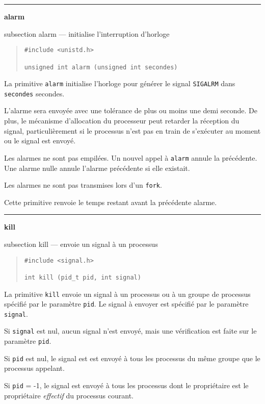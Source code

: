 \documentclass [twoside] {report}
\newcommand {\primitive} [1]
    {
	\phantomsection
	{\large \bf #1}
	\addcontentsline {toc} {subsection} {#1}
    }
\newcommand {\separation}
    {
	\vspace {5mm}
	\nopagebreak
	\hrule
    }
\begin{document}
\separation
\primitive {alarm} --- initialise l'interruption d'horloge

\begin {quote}
\begin {verbatim}
#include <unistd.h>

unsigned int alarm (unsigned int secondes)
\end{verbatim}
\end {quote}

La primitive {\tt alarm} initialise l'horloge pour
générer le signal {\tt SIGALRM} dans {\tt secondes}
secondes.

L'alarme sera envoyée avec une tolérance de plus ou
moins une demi seconde. De plus, le mécanisme
d'allocation du processeur peut retarder la
réception du signal, particulièrement si le
processus n'est pas en train de s'exécuter au
moment ou le signal est envoyé.

Les alarmes ne sont pas empilées. Un nouvel appel
à {\tt alarm} annule la précédente. Une alarme nulle
annule l'alarme précédente si elle existait.

Les alarmes ne sont pas transmises lors d'un
{\tt fork}.

Cette primitive renvoie le temps restant avant la
précédente alarme.




\separation
\primitive {kill} --- envoie un signal à un processus
    \label {kill}

\begin {quote}
\begin {verbatim}
#include <signal.h>

int kill (pid_t pid, int signal)
\end{verbatim}
\end {quote}

La primitive {\tt kill} envoie un signal à un
processus ou à un groupe de processus spécifié par
le paramètre {\tt pid}. Le signal à envoyer est
spécifié par le paramètre {\tt signal}.

Si {\tt signal} est nul, aucun signal n'est envoyé,
mais une vérification est faite
sur le paramètre {\tt pid}.

Si {\tt pid} est nul, le signal est est envoyé à tous
les processus du même groupe que le processus
appelant.

Si {\tt pid} = -1, le signal est envoyé à tous les
processus dont le propriétaire est le propriétaire
{\it effectif} du processus courant.
\end{document}
